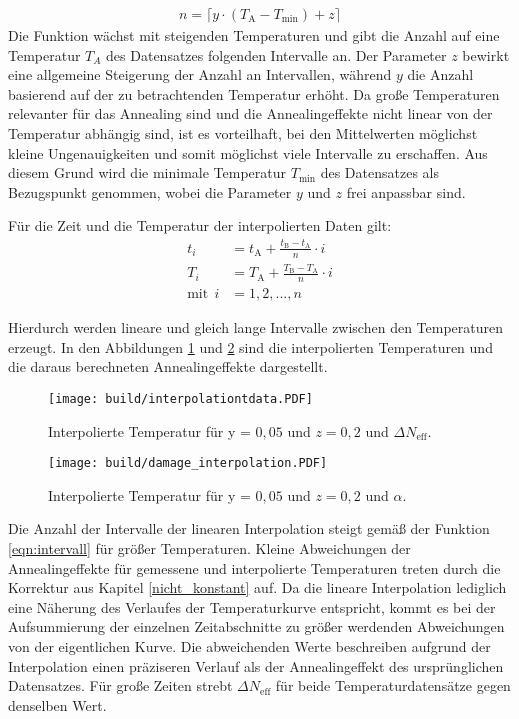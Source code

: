 \begin{align*}
  n = \lceil{y \cdot (T_{\mathrm{A}}-T_{\mathrm{min}})+ z}\rceil \label{eqn:intervall}
\end{align*}
Die Funktion wächst mit steigenden Temperaturen und gibt die Anzahl auf eine Temperatur $T_A$ des
Datensatzes folgenden Intervalle an. Der Parameter $z$ bewirkt eine allgemeine Steigerung
der Anzahl an Intervallen, während $y$ die Anzahl basierend auf der zu betrachtenden Temperatur
erhöht.
Da große Temperaturen relevanter für das Annealing sind und die Annealingeffekte nicht linear von
der Temperatur abhängig sind, ist es vorteilhaft,
bei den Mittelwerten möglichst kleine Ungenauigkeiten und somit möglichst viele
Intervalle zu erschaffen. Aus diesem Grund wird die minimale Temperatur $T_{\mathrm{min}}$ des Datensatzes
als Bezugspunkt genommen, wobei die Parameter $y$ und $z$ frei anpassbar sind.

Für die Zeit und die Temperatur der interpolierten Daten gilt:
\begin{align}
  t_i &= t_{\mathrm{A}} +  \frac{t_{\mathrm{B}}-t_{\mathrm{A}}}{n} \cdot i \\
  T_i &= T_{\mathrm{A}} +  \frac{T_{\mathrm{B}}-T_{\mathrm{A}}}{n} \cdot i \\
  \text{mit}\:\:i &= 1, 2, ..., n
\end{align}

Hierdurch werden lineare und gleich lange Intervalle zwischen den Temperaturen
erzeugt. In den Abbildungen \ref{fig:interpolation_N_eff} und \ref{fig:interpolation_damage} sind die interpolierten Temperaturen und
die daraus berechneten Annealingeffekte dargestellt.

\begin{figure}
    \texttt{[image: build/interpolationtdata.PDF]}
\caption{Interpolierte Temperatur für y = $0,05$ und $z=0,2$ und $\Delta N_{\mathrm{eff}}$.}
\label{fig:interpolation_N_eff}
\end{figure}



\begin{figure}
  \centering
    \texttt{[image: build/damage\_interpolation.PDF]}
\caption{Interpolierte Temperatur für y = $0,05$ und $z=0,2$ und $\alpha$.}
\label{fig:interpolation_damage}
\end{figure}

Die Anzahl der Intervalle der linearen Interpolation steigt gemäß der Funktion \ref{eqn:intervall}
für größer Temperaturen. Kleine Abweichungen der Annealingeffekte für gemessene und
interpolierte Temperaturen treten durch die Korrektur aus Kapitel \ref{nicht_konstant}
auf. Da die lineare Interpolation lediglich eine Näherung des Verlaufes der
Temperaturkurve entspricht, kommt es bei der Aufsummierung der einzelnen Zeitabschnitte
zu größer werdenden Abweichungen von der eigentlichen Kurve. Die abweichenden Werte beschreiben
aufgrund der Interpolation einen präziseren Verlauf als der Annealingeffekt des ursprünglichen Datensatzes.
Für große Zeiten strebt $\Delta N_{\mathrm{eff}}$
für beide Temperaturdatensätze gegen denselben Wert.

